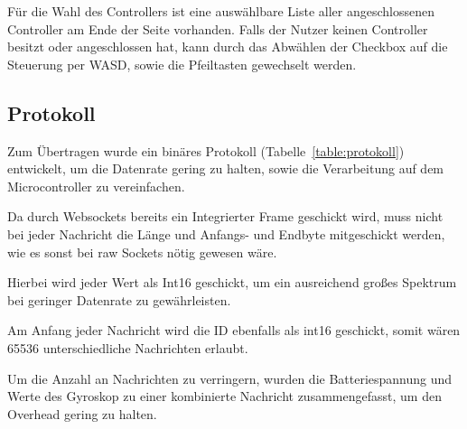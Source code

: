 \vspace{\baselineskip}
Für die Wahl des Controllers ist eine auswählbare Liste aller angeschlossenen Controller am Ende der Seite vorhanden. Falls der Nutzer keinen Controller besitzt oder angeschlossen hat, kann durch das Abwählen der Checkbox auf die Steuerung per WASD, sowie die Pfeiltasten gewechselt werden.\par

\subsection{Protokoll}
Zum Übertragen wurde ein binäres Protokoll (Tabelle~\ref{table:protokoll}) entwickelt, um die Datenrate gering zu halten, sowie die Verarbeitung auf dem Microcontroller zu vereinfachen.\par

Da durch Websockets bereits ein Integrierter Frame geschickt wird, muss nicht bei jeder Nachricht die Länge und Anfangs- und Endbyte mitgeschickt werden, wie es sonst bei raw Sockets nötig gewesen wäre.\par

Hierbei wird jeder Wert als Int16 geschickt, um ein ausreichend großes Spektrum bei geringer Datenrate zu gewährleisten. \par

Am Anfang jeder Nachricht wird die ID ebenfalls als int16 geschickt, somit wären 65536 unterschiedliche Nachrichten erlaubt.\par

Um die Anzahl an Nachrichten zu verringern, wurden die Batteriespannung und Werte des Gyroskop zu einer kombinierte Nachricht zusammengefasst, um den Overhead gering zu halten.\par

\begin{table}[ht]
	\centering
\caption{Binäres Protokoll} 
\label{table:protokoll}
\end{table} 



